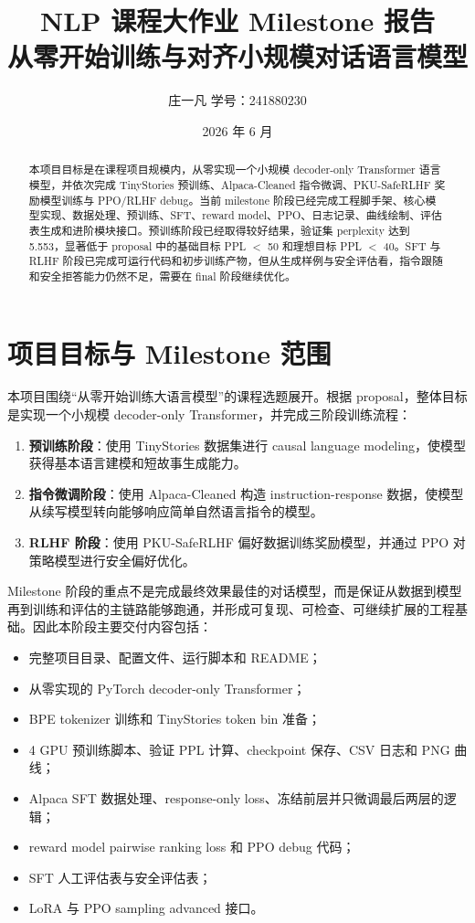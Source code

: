 \documentclass[UTF8,zihao=-4]{ctexart}
\title{\textbf{NLP 课程大作业 Milestone 报告}\\
\large 从零开始训练与对齐小规模对话语言模型}
\author{庄一凡 \quad 学号：241880230}
\date{2026 年 6 月}
\begin{document}
\maketitle

\begin{abstract}
本项目目标是在课程项目规模内，从零实现一个小规模 decoder-only Transformer 语言模型，并依次完成 TinyStories 预训练、Alpaca-Cleaned 指令微调、PKU-SafeRLHF 奖励模型训练与 PPO/RLHF debug。当前 milestone 阶段已经完成工程脚手架、核心模型实现、数据处理、预训练、SFT、reward model、PPO、日志记录、曲线绘制、评估表生成和进阶模块接口。预训练阶段已经取得较好结果，验证集 perplexity 达到 5.553，显著低于 proposal 中的基础目标 PPL $<$ 50 和理想目标 PPL $<$ 40。SFT 与 RLHF 阶段已完成可运行代码和初步训练产物，但从生成样例与安全评估看，指令跟随和安全拒答能力仍然不足，需要在 final 阶段继续优化。
\end{abstract}

\section{项目目标与 Milestone 范围}

本项目围绕“从零开始训练大语言模型”的课程选题展开。根据 proposal，整体目标是实现一个小规模 decoder-only Transformer，并完成三阶段训练流程：

\begin{enumerate}
  \item \textbf{预训练阶段}：使用 TinyStories 数据集进行 causal language modeling，使模型获得基本语言建模和短故事生成能力。
  \item \textbf{指令微调阶段}：使用 Alpaca-Cleaned 构造 instruction-response 数据，使模型从续写模型转向能够响应简单自然语言指令的模型。
  \item \textbf{RLHF 阶段}：使用 PKU-SafeRLHF 偏好数据训练奖励模型，并通过 PPO 对策略模型进行安全偏好优化。
\end{enumerate}

Milestone 阶段的重点不是完成最终效果最佳的对话模型，而是保证从数据到模型再到训练和评估的主链路能够跑通，并形成可复现、可检查、可继续扩展的工程基础。因此本阶段主要交付内容包括：

\begin{itemize}
  \item 完整项目目录、配置文件、运行脚本和 README；
  \item 从零实现的 PyTorch decoder-only Transformer；
  \item BPE tokenizer 训练和 TinyStories token bin 准备；
  \item 4 GPU 预训练脚本、验证 PPL 计算、checkpoint 保存、CSV 日志和 PNG 曲线；
  \item Alpaca SFT 数据处理、response-only loss、冻结前层并只微调最后两层的逻辑；
  \item reward model pairwise ranking loss 和 PPO debug 代码；
  \item SFT 人工评估表与安全评估表；
  \item LoRA 与 PPO sampling advanced 接口。
\end{itemize}
\end{document}
